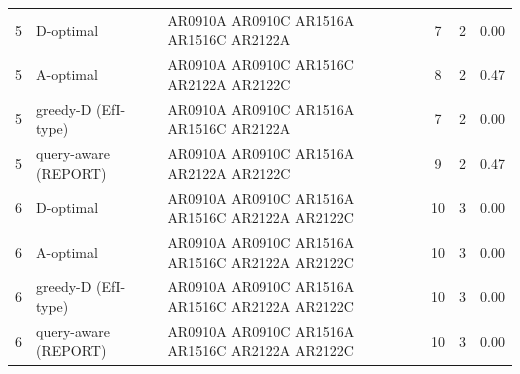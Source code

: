 {\begin{longtable}{clp{5.6cm}ccc}
5 & D-optimal & AR0910A AR0910C AR1516A AR1516C AR2122A & 7 & 2 & 0.00 \\
5 & A-optimal & AR0910A AR0910C AR1516C AR2122A AR2122C & 8 & 2 & 0.47 \\
5 & greedy-D (EfI-type) & AR0910A AR0910C AR1516A AR1516C AR2122A & 7 & 2 & 0.00 \\
5 & query-aware (REPORT) & AR0910A AR0910C AR1516A AR2122A AR2122C & 9 & 2 & 0.47 \\
6 & D-optimal & AR0910A AR0910C AR1516A AR1516C AR2122A AR2122C & 10 & 3 & 0.00 \\
6 & A-optimal & AR0910A AR0910C AR1516A AR1516C AR2122A AR2122C & 10 & 3 & 0.00 \\
6 & greedy-D (EfI-type) & AR0910A AR0910C AR1516A AR1516C AR2122A AR2122C & 10 & 3 & 0.00 \\
6 & query-aware (REPORT) & AR0910A AR0910C AR1516A AR1516C AR2122A AR2122C & 10 & 3 & 0.00 \\
\bottomrule
\end{longtable}
}